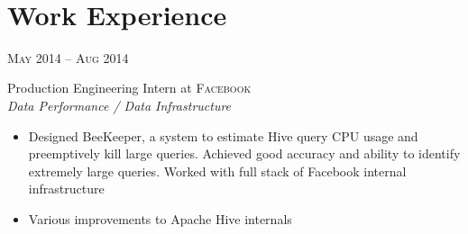 \documentclass[10pt]{article} %
\begin{document}
\renewcommand{\labelitemi}{$\star$}

\color{text1} %


\par{\\ %
	

\begin{minipage}[t]{0.5\textwidth} %
\vspace{0pt} %
	

\section{Work Experience} 


{\raggedleft\textsc{May 2014 -- Aug 2014}\par}

{\raggedright\large Production Engineering Intern at \textsc{Facebook}\\
\textit{Data Performance / Data Infrastructure}\\[5pt]}

\normalsize{
  \begin{itemize}
  \item Designed BeeKeeper, a system to estimate Hive query CPU usage and
    preemptively kill large queries. Achieved good accuracy and ability to
    identify extremely large queries. Worked with full stack of Facebook
    internal infrastructure
  \item Various improvements to Apache Hive internals
  \end{itemize}
}\\


\end{minipage}}
\end{document}
